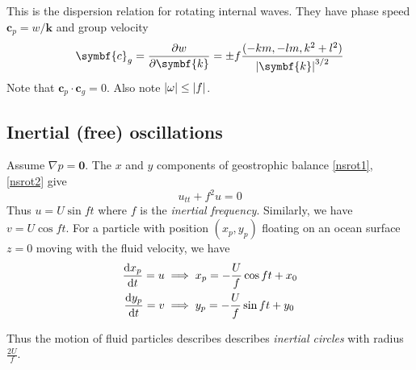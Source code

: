 \documentclass{jknotes}
\begin{document}
\begin{center}
\end{center}

This is the dispersion relation for rotating internal waves. They have phase
speed $\symbf{c}_p = w/\symbf{k}$ and group velocity 
\begin{equation}
	\symbf{c}_g = \frac{\partial w}{\partial \symbf{k}} = \pm f \frac{(-km, -lm, k^2
		+ l^2)}{\abs{\symbf{k}}^{3/2}}
\end{equation}
Note that $\symbf{c}_p\cdot\symbf{c}_g = 0$. Also note $\abs{\omega} \le \abs{f}$.

\subsection{Inertial (free) oscillations}
Assume $\nabla p = \symbf{0}$.  The $x$ and $y$ components of geostrophic balance
\eqref{nsrot1}, \eqref{nsrot2} give
\begin{equation}
	u_{tt} + f^2 u = 0
\end{equation}
Thus $u = U \sin ft$ where $f$ is the \emph{inertial frequency}. Similarly, we
have $v = U \cos ft$. For a particle with position $(x_p, y_p)$ floating on an
ocean surface $z=0$ moving with the fluid velocity, we have
\begin{equation}
	\begin{aligned}
		\frac{\diffd x_p}{\diffd t} = u &\implies x_p = -\frac{U}{f} \cos ft +
		x_0 \\
		\frac{\diffd y_p}{\diffd t} = v &\implies y_p = -\frac{U}{f} \sin ft +
		y_0
	\end{aligned}
\end{equation}

Thus the motion of fluid particles describes describes \emph{inertial circles}
with radius $\frac{2U}{f}$.
\end{document}
